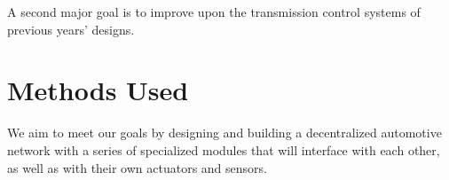 A second major goal is to improve upon the transmission control systems of previous years' designs.


\section{Methods Used}

We aim to meet our goals by designing and building a decentralized automotive network with a series of specialized modules that will interface with each other, as well as with their own actuators and sensors.
